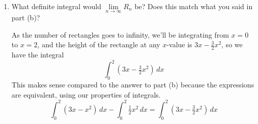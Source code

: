 \documentclass{article}
\begin{document}
\begin{enumerate}
\begin{enumerate}[resume]
\begin{solution}
From the diagram, we can see that the height of a rectangle is the \emph{difference} between the $y$-coordinate of the top curve and the $y$-coordinate of the bottom curve at the same $x$-coordinate. For example, the height of the first rectangle is $[3(\frac{1}{2})-(\frac{1}{2})^2] - [\frac{1}{2}(\frac{1}{2})^2]=\frac{9}{8}$. Since the equation of the top curve is $y=3x-x^2$ and the equation of the bottom curve is $y=\frac{1}{2}x^2$, the difference $3x-\frac{3}{2}x^2$ gives us the heights of the rectangles at some $x$-value.
\begin{align*}
    R_4 &= \tfrac{1}{2}[3(\tfrac{1}{2})-\tfrac{3}{2}(\tfrac{1}{2})^2] + \tfrac{1}{2}[3(1)-\tfrac{3}{2}(1)^2] + 
    \tfrac{1}{2}[3(\tfrac{3}{2})-\tfrac{3}{2}(\tfrac{3}{2})^2]+
    \tfrac{1}{2}[3(2)-\tfrac{3}{2}(2)^2]
    \intertext{In sigma notation,}
    R_4 &= \sum_{k=1}^4 \tfrac{1}{2}\big[3(\tfrac{k}{2})-\tfrac{3}{2}(\tfrac{k}{2})^2\big] \\
    \intertext{Evaluating,}
    &= \tfrac{1}{2}(\tfrac{9}{8}) + \tfrac{1}{2}(\tfrac{3}{2}) + \tfrac{1}{2}(\tfrac{9}{8})+\tfrac{1}{2}(0) \\
    &= \tfrac{15}{8}
\end{align*}
This value makes sense, because we found in part (b) that the exact area is $2$, and $\frac{15}{8}\approx 2$.
\end{solution}

\item 
\begin{problem}
    What definite integral would $\lim\limits_{n\to\infty} R_n$ be? Does this match what you said in part (b)?
\end{problem}

\begin{solution}
    As the number of rectangles goes to infinity, we'll be integrating from $x=0$ to $x=2$, and the height of the rectangle at any $x$-value is $3x-\tfrac{3}{2}x^2$, so we have the integral 
    \[\int_0^2 (3x-\tfrac{3}{2}x^2)\,dx\]
    This makes sense compared to the answer to part (b) because the expressions are equivalent, using our properties of integrals.
    \[\int_0^2 (3x-x^2)\,dx - \int_0^2 \tfrac{1}{2}x^2\,dx = \int_0^2 (3x-\tfrac{3}{2}x^2)\,dx\]
\end{solution}
\end{enumerate}



\end{enumerate}
\end{document}
